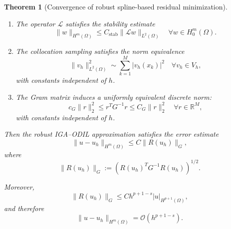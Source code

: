 \documentclass[review]{elsarticle}
\newtheorem{theorem}{Theorem}
\begin{document}
\begin{theorem}[Convergence of robust spline-based residual minimization]
\begin{enumerate}
\item
The operator $\mathcal{L}$ satisfies the stability estimate
\begin{equation}
\|w\|_{H^m(\Omega)}
\le
C_{\mathrm{stab}}
\|\mathcal{L}w\|_{L^2(\Omega)}
\quad
\forall w\in H_0^m(\Omega).
\label{eq:stability_assumption_theorem}
\end{equation}

\item
The collocation sampling satisfies the norm equivalence
\begin{equation}
\|v_h\|_{L^2(\Omega)}^2
\sim
\sum_{k=1}^{M}
|v_h(x_k)|^2
\quad
\forall v_h\in V_h,
\label{eq:sampling_equivalence_theorem}
\end{equation}
with constants independent of $h$.

\item
The Gram matrix induces a uniformly equivalent discrete norm:
\begin{equation}
c_G\|r\|_2^2
\le
r^TG^{-1}r
\le
C_G\|r\|_2^2
\quad
\forall r\in\mathbb{R}^M,
\label{eq:gram_equivalence_theorem}
\end{equation}
with constants independent of $h$.

\end{enumerate}

Then the robust IGA--ODIL approximation satisfies the error estimate
\begin{equation}
\|u-u_h\|_{H^m(\Omega)}
\le
C
\|R(u_h)\|_G,
\label{eq:error_equivalence}
\end{equation}
where
\begin{equation}
\|R(u_h)\|_G
:=
\left(
R(u_h)^TG^{-1}R(u_h)
\right)^{1/2}.
\label{eq:robust_norm}
\end{equation}

Moreover,
\begin{equation}
\|R(u_h)\|_G
\le
C
h^{p+1-s}
|u|_{H^{p+1}(\Omega)},
\label{eq:residual_convergence_theorem}
\end{equation}
and therefore
\begin{equation}
\|u-u_h\|_{H^m(\Omega)}
=
\mathcal{O}(h^{p+1-s}).
\label{eq:final_rate_theorem}
\end{equation}

\end{theorem}
\end{document}
